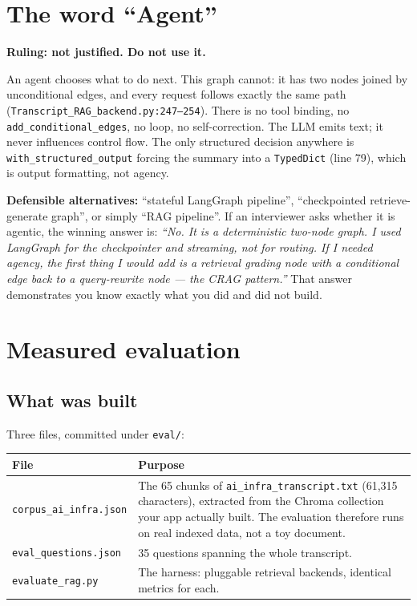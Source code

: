 \documentclass[11pt,a4paper]{article}
\begin{document}
\section{The word ``Agent''}\label{sec:agent}

\textbf{Ruling: not justified. Do not use it.}

An agent chooses what to do next. This graph cannot: it has two nodes joined by
unconditional edges, and every request follows exactly the same path
(\texttt{Transcript\_RAG\_backend.py:247--254}). There is no tool binding, no
\texttt{add\_conditional\_edges}, no loop, no self-correction. The LLM emits text;
it never influences control flow. The only structured decision anywhere is
\texttt{with\_structured\_output} forcing the summary into a \texttt{TypedDict}
(line 79), which is output formatting, not agency.

\noindent
\textbf{Defensible alternatives:} ``stateful LangGraph pipeline'',
``checkpointed retrieve-generate graph'', or simply ``RAG pipeline''. If an
interviewer asks whether it is agentic, the winning answer is: \emph{``No. It is a
deterministic two-node graph. I used LangGraph for the checkpointer and streaming,
not for routing. If I needed agency, the first thing I would add is a retrieval
grading node with a conditional edge back to a query-rewrite node --- the CRAG
pattern.''} That answer demonstrates you know exactly what you did and did not
build.

\section{Measured evaluation}\label{sec:eval}

\subsection{What was built}

Three files, committed under \texttt{eval/}:

\begin{longtable}{@{}p{4.6cm}p{10.9cm}@{}}
\toprule
\textbf{File} & \textbf{Purpose} \\
\midrule
\endhead
\texttt{corpus\_ai\_infra.json} & The 65 chunks of
\texttt{ai\_infra\_transcript.txt} (61{,}315 characters), extracted from the
Chroma collection your app actually built. The evaluation therefore runs on real
indexed data, not a toy document. \\
\texttt{eval\_questions.json} & 35 questions spanning the whole transcript. \\
\texttt{evaluate\_rag.py} & The harness: pluggable retrieval backends, identical
metrics for each. \\
\bottomrule
\end{longtable}
\end{document}
